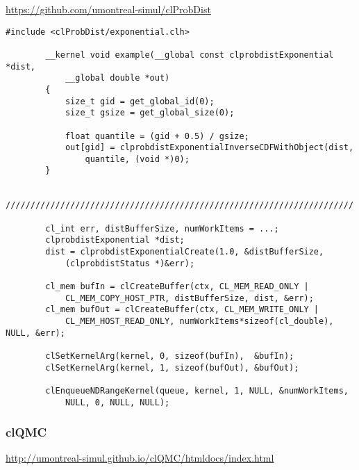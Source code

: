             \url{https://github.com/umontreal-simul/clProbDist}
            \begin{lstlisting}[caption=clProbDist Beispiel]
        #include <clProbDist/exponential.clh>                             
                                                                          
        __kernel void example(__global const clprobdistExponential *dist, 
            __global double *out)                       
        {                                                        
            size_t gid = get_global_id(0);                                   
            size_t gsize = get_global_size(0);                               
				
            float quantile = (gid + 0.5) / gsize;                        
            out[gid] = clprobdistExponentialInverseCDFWithObject(dist, 
                quantile, (void *)0); 
        } 
		 
        //////////////////////////////////////////////////////////////////////
			
        cl_int err, distBufferSize, numWorkItems = ...;
        clprobdistExponential *dist;
        dist = clprobdistExponentialCreate(1.0, &distBufferSize, 
            (clprobdistStatus *)&err);    
			
        cl_mem bufIn = clCreateBuffer(ctx, CL_MEM_READ_ONLY |
            CL_MEM_COPY_HOST_PTR, distBufferSize, dist, &err);
        cl_mem bufOut = clCreateBuffer(ctx, CL_MEM_WRITE_ONLY | 
            CL_MEM_HOST_READ_ONLY, numWorkItems*sizeof(cl_double), NULL, &err);
            
        clSetKernelArg(kernel, 0, sizeof(bufIn),  &bufIn);
        clSetKernelArg(kernel, 1, sizeof(bufOut), &bufOut);
			
        clEnqueueNDRangeKernel(queue, kernel, 1, NULL, &numWorkItems, 
            NULL, 0, NULL, NULL);		
            \end{lstlisting}
			
            \subsubsection{clQMC}
            \url{http://umontreal-simul.github.io/clQMC/htmldocs/index.html}
			
